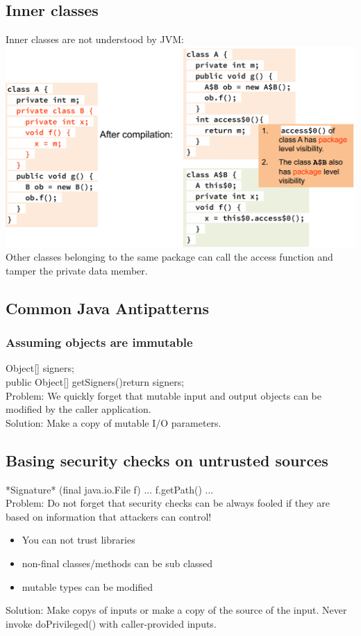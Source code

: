 \documentclass[10pt]{article}
\begin{document}
\subsection{Inner classes}
Inner classes are not understood by JVM:\\
\includegraphics[scale=0.4]{inner_classes_jvm.png}\\
Other classes belonging to the same package can call the access function and tamper the private data member.
\subsection{Common Java Antipatterns}
\subsubsection{Assuming objects are immutable}
Object[] signers;\\
public Object[] getSigners(){return signers;}\\
Problem: We quickly forget that mutable input and output objects can be modified by the caller application.\\
Solution: Make a copy of mutable I/O parameters.
\subsection{Basing security checks on untrusted sources}
*Signature* (final java.io.File f) { ... f.getPath() ... }\\
Problem: Do not forget that security checks can be always fooled if they are based on information that attackers can control!
\begin{itemize}
	\item You can not trust libraries
	\item non-final classes/methods can be sub classed
	\item mutable types can be modified
\end{itemize}
Solution: Make copys of inputs or make a copy of the source of the input. Never invoke doPrivileged() with caller-provided inputs.
\end{document}
